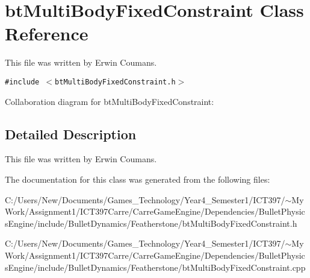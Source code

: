 \hypertarget{classbt_multi_body_fixed_constraint}{
\section{btMultiBodyFixedConstraint Class Reference}
\label{classbt_multi_body_fixed_constraint}
}
This file was written by Erwin Coumans.  


{\tt \#include $<$btMultiBodyFixedConstraint.h$>$}

Collaboration diagram for btMultiBodyFixedConstraint:

\subsection{Detailed Description}
This file was written by Erwin Coumans. 

The documentation for this class was generated from the following files:\begin{CompactItemize}
\item 
C:/Users/New/Documents/Games\_\-Technology/Year4\_\-Semester1/ICT397/$\sim$My Work/Assignment1/ICT397Carre/CarreGameEngine/Dependencies/BulletPhysicsEngine/include/BulletDynamics/Featherstone/btMultiBodyFixedConstraint.h\item 
C:/Users/New/Documents/Games\_\-Technology/Year4\_\-Semester1/ICT397/$\sim$My Work/Assignment1/ICT397Carre/CarreGameEngine/Dependencies/BulletPhysicsEngine/include/BulletDynamics/Featherstone/btMultiBodyFixedConstraint.cpp\end{CompactItemize}
